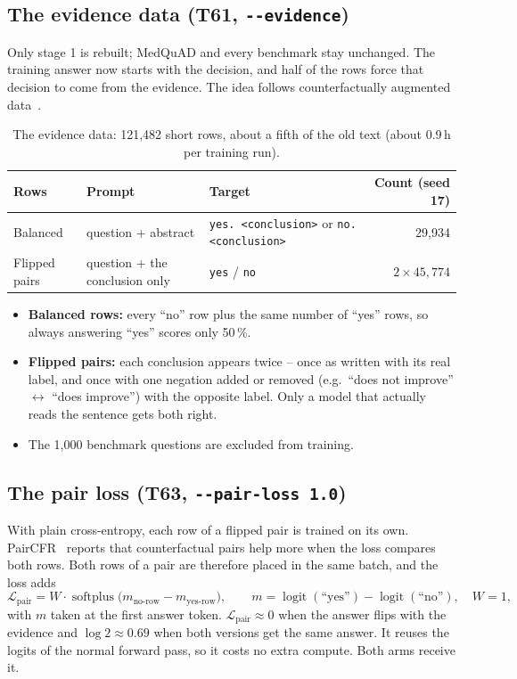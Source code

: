 \documentclass[a4paper,11pt,parskip=half]{scrartcl}
\newcommand{\code}[1]{\texttt{\small #1}}
\begin{document}
\subsection{The evidence data (T61, \code{-{}-evidence})}

Only stage 1 is rebuilt; MedQuAD and every benchmark stay unchanged. The training answer now starts with the decision, and half of the rows force that decision to come from the evidence. The idea follows counterfactually augmented data~\cite{kaushik}.

\begin{table}[H]
\centering\small
\begin{tabularx}{\linewidth}{@{}lYYr@{}}
\toprule
Rows & Prompt & Target & Count (seed 17)\\
\midrule
Balanced & question + abstract & \code{yes. <conclusion>} or \code{no. <conclusion>} & 29{,}934\\
Flipped pairs & question + the conclusion only & \code{yes} / \code{no} & $2\times45{,}774$\\
\bottomrule
\end{tabularx}
\caption{The evidence data: 121{,}482 short rows, about a fifth of the old text (about 0.9\,h per training run).}
\end{table}

\begin{itemize}
  \item \textbf{Balanced rows:} every ``no'' row plus the same number of ``yes'' rows, so always answering ``yes'' scores only 50\,\%.
  \item \textbf{Flipped pairs:} each conclusion appears twice -- once as written with its real label, and once with one negation added or removed (e.g.\ ``does not improve'' $\leftrightarrow$ ``does improve'') with the opposite label. Only a model that actually reads the sentence gets both right.
  \item The 1{,}000 benchmark questions are excluded from training.
\end{itemize}

\subsection{The pair loss (T63, \code{-{}-pair-loss 1.0})}

With plain cross-entropy, each row of a flipped pair is trained on its own. PairCFR~\cite{paircfr} reports that counterfactual pairs help more when the loss compares both rows. Both rows of a pair are therefore placed in the same batch, and the loss adds
\begin{equation}
  \mathcal{L}_{\text{pair}} = W \cdot \operatorname{softplus}\big(m_{\text{no-row}} - m_{\text{yes-row}}\big), \qquad
  m = \operatorname{logit}(\text{``yes''}) - \operatorname{logit}(\text{``no''}), \quad W = 1,
\end{equation}
with $m$ taken at the first answer token. $\mathcal{L}_{\text{pair}} \approx 0$ when the answer flips with the evidence and $\log 2 \approx 0.69$ when both versions get the same answer. It reuses the logits of the normal forward pass, so it costs no extra compute. Both arms receive it.
\end{document}
